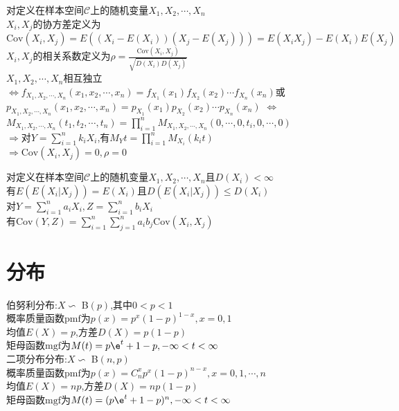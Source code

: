 \begin{dingyi}
对定义在样本空间$\mathcal{C}$上的随机变量$X_1,X_2,\cdots,X_n$\\
$X_i,X_j$的协方差定义为$\mathrm{Cov}(X_i,X_j)=E((X_i-E(X_i))(X_j-E(X_j)))=E(X_iX_j)-E(X_i)E(X_j)$\\
$X_i,X_j$的相关系数定义为$\rho=\frac{\mathrm{Cov}(X_i,X_j)}{\sqrt{D(X_i)D(X_j)}}$\\
$X_1,X_2,\cdots,X_n$相互独立\\
$\Leftrightarrow$$f_{X_1,X_2,\cdots,X_n}(x_1,x_2,\cdots,x_n)=f_{X_1}(x_1)f_{X_2}(x_2)\cdots f_{X_n}(x_n)$或$p_{X_1,X_2,\cdots,X_n}(x_1,x_2,\cdots,x_n)=p_{X_1}(x_1)p_{X_2}(x_2)\cdots p_{X_n}(x_n)$
$\Leftrightarrow$$M_{X_1,X_2,\cdots,X_n}(t_1,t_2,\cdots,t_n)=\prod\limits_{i=1}^{n}M_{X_1,X_2,\cdots,X_n}(0,\cdots,0,t_i,0,\cdots,0)$\\
$\Rightarrow$对$Y=\sum\limits_{i=1}^{n}k_iX_i$,有$M_Y{t}=\prod\limits_{i=1}^{n}M_{X_i}(k_it)$\\
$\Rightarrow$$\mathrm{Cov}(X_i,X_j)=0,\rho=0$
\end{dingyi}

\begin{dingli}
对定义在样本空间$\mathcal{C}$上的随机变量$X_1,X_2,\cdots,X_n$且$D(X_i)<\infty$\\
有$E(E(X_i|X_j))=E(X_i)$且$D(E(X_i|X_j))\leq D(X_i)$\\
对$Y=\sum\limits_{i=1}^{n}a_iX_i,Z=\sum\limits_{i=1}^{n}b_iX_i$\\
有$\mathrm{Cov}(Y,Z)=\sum\limits_{i=1}^{n}\sum\limits_{j=1}^{n}a_ib_j\mathrm{Cov}(X_i,X_j)$
\end{dingli}

\chapter{分布}

伯努利分布:$X\backsim$ B$(p)$,其中$0<p<1$\\
概率质量函数$\mathrm{pmf}$为$p(x)=p^x(1-p)^{1-x},x=0,1$\\
均值$E(X)=p$,方差$D(X)=p(1-p)$\\
矩母函数$\mathrm{mgf}$为$M(t)=p\e^t+1-p,-\infty<t<\infty$\\

二项分布分布:$X\backsim$ B$(n,p)$\\
概率质量函数$\mathrm{pmf}$为$p(x)=C_n^xp^x(1-p)^{n-x},x=0,1,\cdots,n$\\
均值$E(X)=np$,方差$D(X)=np(1-p)$\\
矩母函数$\mathrm{mgf}$为$M(t)=(p\e^t+1-p)^n,-\infty<t<\infty$\\

